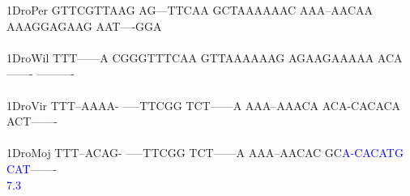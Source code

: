\documentclass[11pt,twoside,reqno,a4paper]{article}
\begin{document}
{1\hspace*{3\charwidth}DroPer	GTTCGTTAAG	AG---TTCAA	GCTAAAAAAC	AAA--AACAA	AAAGGAGAAG	AAT----GGA	\\
\hspace*{4\charwidth}\hspace*{7\charwidth}\hspace*{1\charwidth}\hspace*{1\charwidth}\hspace*{1\charwidth}\hspace*{1\charwidth}\hspace*{1\charwidth}\hspace*{1\charwidth}\\
1\hspace*{3\charwidth}DroWil	TTT------A	CGGGTTTCAA	GTTAAAAAAG	AGAAGAAAAA	ACA-------	----------	\\
\hspace*{4\charwidth}\hspace*{7\charwidth}\hspace*{1\charwidth}\hspace*{1\charwidth}\hspace*{1\charwidth}\hspace*{1\charwidth}\hspace*{1\charwidth}\hspace*{1\charwidth}\\
1\hspace*{3\charwidth}DroVir	TTT--AAAA-	-----TTCGG	TCT------A	AAA--AAACA	ACA-CACACA	ACT-------	\\
\hspace*{4\charwidth}\hspace*{7\charwidth}\hspace*{1\charwidth}\hspace*{1\charwidth}\hspace*{1\charwidth}\hspace*{1\charwidth}\hspace*{1\charwidth}\hspace*{1\charwidth}\\
1\hspace*{3\charwidth}DroMoj	TTT--ACAG-	-----TTCGG	TCT------A	AAA--AACAC	GC\textcolor{Blue}{A}\textcolor{Blue}{-}\textcolor{Blue}{C}\textcolor{Blue}{A}\textcolor{Blue}{C}\textcolor{Blue}{A}\textcolor{Blue}{T}\textcolor{Blue}{G}	\textcolor{Blue}{C}\textcolor{Blue}{A}\textcolor{Blue}{T}-------	\\
\hspace*{4\charwidth}\hspace*{7\charwidth}\hspace*{1\charwidth}\hspace*{1\charwidth}\hspace*{1\charwidth}\hspace*{1\charwidth}\hspace*{42\charwidth}\textcolor{Blue}{7.3}\hspace*{1\charwidth}\hspace*{1\charwidth}\\
}
\end{document}
